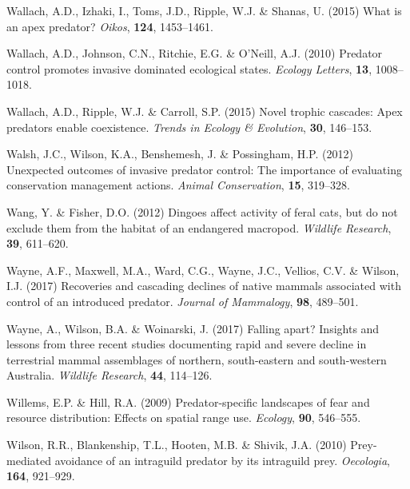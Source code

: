 \documentclass[11pt,a4paper,titlepage,twoside,openright]{style/unimelbthesis}
\begin{document}
\begin{mainmatter}
\leavevmode\hypertarget{ref-wallach2015apex}{}%
Wallach, A.D., Izhaki, I., Toms, J.D., Ripple, W.J. \& Shanas, U. (2015) What is an apex predator? \emph{Oikos}, \textbf{124}, 1453--1461.

\leavevmode\hypertarget{ref-wallach2010predator}{}%
Wallach, A.D., Johnson, C.N., Ritchie, E.G. \& O'Neill, A.J. (2010) Predator control promotes invasive dominated ecological states. \emph{Ecology Letters}, \textbf{13}, 1008--1018.

\leavevmode\hypertarget{ref-wallach2015novel}{}%
Wallach, A.D., Ripple, W.J. \& Carroll, S.P. (2015) Novel trophic cascades: Apex predators enable coexistence. \emph{Trends in Ecology \& Evolution}, \textbf{30}, 146--153.

\leavevmode\hypertarget{ref-walsh2012unexpected}{}%
Walsh, J.C., Wilson, K.A., Benshemesh, J. \& Possingham, H.P. (2012) Unexpected outcomes of invasive predator control: The importance of evaluating conservation management actions. \emph{Animal Conservation}, \textbf{15}, 319--328.

\leavevmode\hypertarget{ref-wang2012dingoes}{}%
Wang, Y. \& Fisher, D.O. (2012) Dingoes affect activity of feral cats, but do not exclude them from the habitat of an endangered macropod. \emph{Wildlife Research}, \textbf{39}, 611--620.

\leavevmode\hypertarget{ref-wayne2017recoveries}{}%
Wayne, A.F., Maxwell, M.A., Ward, C.G., Wayne, J.C., Vellios, C.V. \& Wilson, I.J. (2017) Recoveries and cascading declines of native mammals associated with control of an introduced predator. \emph{Journal of Mammalogy}, \textbf{98}, 489--501.

\leavevmode\hypertarget{ref-wayne2017falling}{}%
Wayne, A., Wilson, B.A. \& Woinarski, J. (2017) Falling apart? Insights and lessons from three recent studies documenting rapid and severe decline in terrestrial mammal assemblages of northern, south-eastern and south-western Australia. \emph{Wildlife Research}, \textbf{44}, 114--126.

\leavevmode\hypertarget{ref-willems2009predator}{}%
Willems, E.P. \& Hill, R.A. (2009) Predator-specific landscapes of fear and resource distribution: Effects on spatial range use. \emph{Ecology}, \textbf{90}, 546--555.

\leavevmode\hypertarget{ref-wilson2010prey}{}%
Wilson, R.R., Blankenship, T.L., Hooten, M.B. \& Shivik, J.A. (2010) Prey-mediated avoidance of an intraguild predator by its intraguild prey. \emph{Oecologia}, \textbf{164}, 921--929.


\end{mainmatter}
\end{document}
